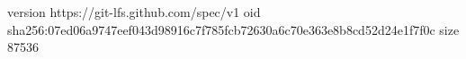 version https://git-lfs.github.com/spec/v1
oid sha256:07ed06a9747eef043d98916c7f785fcb72630a6c70e363e8b8cd52d24e1f7f0c
size 87536
